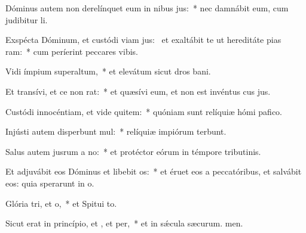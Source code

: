\item Dóminus autem non derelínquet eum in nibus jus:~* nec damnábit eum, cum judibitur li.
\item Exspécta Dóminum, et custódi viam jus:~\pscross{} et exaltábit te ut hereditáte pias ram:~* cum períerint peccares vibis.
\item Vidi ímpium superaltum,~* et elevátum sicut dros bani.
\item Et transívi, et ce non rat:~* et quæsívi eum, et non est invéntus cus jus.
\item Custódi innocéntiam, et vide quitem:~* quóniam sunt relíquiæ hómi pafico.
\item Injústi autem disperbunt mul:~* relíquiæ impiórum terbunt.
\item Salus autem jusrum a no:~* et protéctor eórum in témpore tributinis.
\item Et adjuvábit eos Dóminus et libebit os:~* et éruet eos a peccatóribus, et salvábit eos: quia sperarunt in o.
\item Glória tri, et o,~* et Spitui to.
\item Sicut erat in princípio, et , et per,~* et in sǽcula sæcurum. men.
